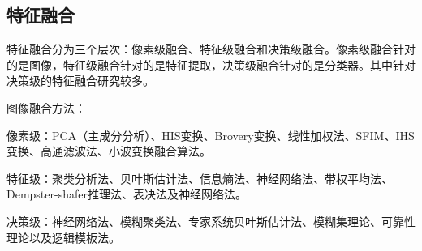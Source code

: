 \subsection{特征融合}
特征融合分为三个层次：像素级融合、特征级融合和决策级融合。像素级融合针对的是图像，特征级融合针对的是特征提取，决策级融合针对的是分类器。其中针对决策级的特征融合研究较多。

图像融合方法：

像素级：PCA（主成分分析）、HIS变换、Brovery变换、线性加权法、SFIM、IHS变换、高通滤波法、小波变换融合算法。

特征级：聚类分析法、贝叶斯估计法、信息熵法、神经网络法、带权平均法、Dempster-shafer推理法、表决法及神经网络法。

决策级：神经网络法、模糊聚类法、专家系统贝叶斯估计法、模糊集理论、可靠性理论以及逻辑模板法。


\begin{comment}
\begin{itemize}
\item 基于灰度共生矩阵的方法
\item 灰度-梯度共生矩阵分析法
\item 灰度行程长度统计法
\item 小波分析法
\item 基于Gabor小波变换的纹理分析法
\end{itemize}
\end{comment}